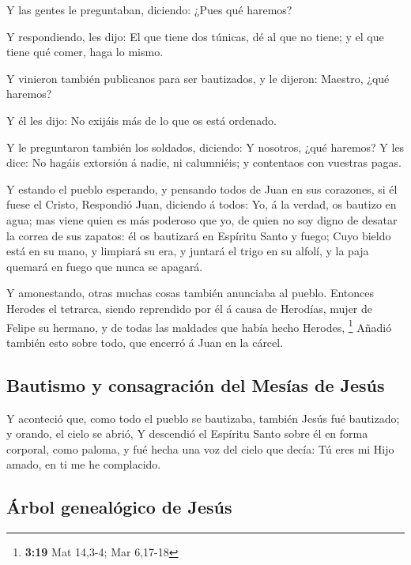  Y las gentes le preguntaban, diciendo: ¿Pues qué
haremos?

 Y respondiendo, les dijo: El que tiene dos túnicas, dé
al que no tiene; y el que tiene qué comer, haga lo mismo.

 Y vinieron también publicanos para ser bautizados, y le
dijeron: Maestro, ¿qué haremos?

 Y él les dijo: No exijáis más de lo que os está
ordenado.

 Y le preguntaron también los soldados, diciendo: Y
nosotros, ¿qué haremos? Y les dice: No hagáis extorsión á nadie, ni
calumniéis; y contentaos con vuestras pagas.

 Y estando el pueblo esperando, y pensando todos de Juan
en sus corazones, si él fuese el Cristo,  Respondió Juan,
diciendo á todos: Yo, á la verdad, os bautizo en agua; mas viene quien
es más poderoso que yo, de quien no soy digno de desatar la correa de
sus zapatos: él os bautizará en Espíritu Santo y fuego; 
Cuyo bieldo está en su mano, y limpiará su era, y juntará el trigo en su
alfolí, y la paja quemará en fuego que nunca se apagará.

 Y amonestando, otras muchas cosas también anunciaba al
pueblo.  Entonces Herodes el tetrarca, siendo reprendido
por él á causa de Herodías, mujer de Felipe su hermano, y de todas las
maldades que había hecho Herodes, \footnote{\textbf{3:19} Mat 14,3-4;
  Mar 6,17-18}  Añadió también esto sobre todo, que
encerró á Juan en la cárcel.

\hypertarget{bautismo-y-consagraciuxf3n-del-mesuxedas-de-jesuxfas}{%
\subsection{Bautismo y consagración del Mesías de
Jesús}\label{bautismo-y-consagraciuxf3n-del-mesuxedas-de-jesuxfas}}

 Y aconteció que, como todo el pueblo se bautizaba,
también Jesús fué bautizado; y orando, el cielo se abrió,
 Y descendió el Espíritu Santo sobre él en forma
corporal, como paloma, y fué hecha una voz del cielo que decía: Tú eres
mi Hijo amado, en ti me he complacido.

\hypertarget{uxe1rbol-genealuxf3gico-de-jesuxfas}{%
\subsection{Árbol genealógico de
Jesús}\label{uxe1rbol-genealuxf3gico-de-jesuxfas}}

